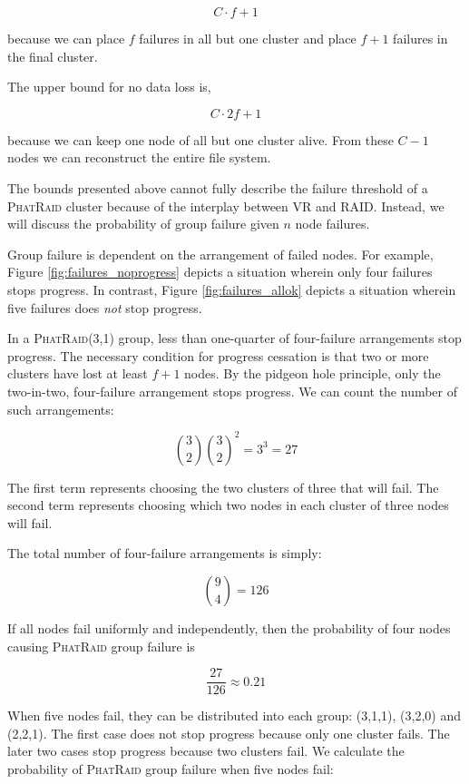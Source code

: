 \documentclass[10pt,letter]{article}
\newcommand{\phatraid}[0]{\textsc{PhatRaid}}
\newcommand{\phatraidcf}[2]{\textsc{PhatRaid}(#1,#2)}
\begin{document}
    $$ C\cdot f + 1 $$

because we can place $f$ failures in all but one cluster and place $f+1$
failures in the final cluster.

The upper bound for no data loss is,

    $$ C\cdot 2f + 1 $$

because we can keep one node of all but one cluster alive. From these $C-1$
nodes we can reconstruct the entire file system.

The bounds presented above cannot fully describe the failure threshold of a
\phatraid{} cluster because of the interplay between VR and RAID. Instead, we
will discuss the probability of group failure given $n$ node failures.

Group failure is dependent on the arrangement of failed nodes. For example,
Figure \ref{fig:failures_noprogress} depicts a situation wherein only four
failures stops progress. In contrast, Figure \ref{fig:failures_allok} depicts a
situation wherein five failures does \emph{not} stop progress.

In a \phatraidcf{3}{1} group, less than one-quarter of four-failure arrangements
stop progress. The necessary condition for progress cessation is that two or
more clusters have lost at least $f+1$ nodes. By the pidgeon hole principle,
only the two-in-two, four-failure arrangement stops progress. We can count the
number of such arrangements:

    $$ \binom{3}{2} \binom{3}{2}^2 = 3^3 = 27 $$

The first term represents choosing the two clusters of three that will
fail. The second term represents choosing which two nodes in each cluster of
three nodes will fail.

The total number of four-failure arrangements is simply:

    $$ \binom{9}{4} = 126 $$

If all nodes fail uniformly and independently, then the probability of four
nodes causing \phatraid{} group failure is

    $$ \frac{27}{126} \approx 0.21 $$

When five nodes fail, they can be distributed into each group: (3,1,1), (3,2,0)
and (2,2,1). The first case does not stop progress because only one cluster
fails. The later two cases stop progress because two clusters fail. We calculate
the probability of \phatraid{} group failure when five nodes fail:
\end{document}
